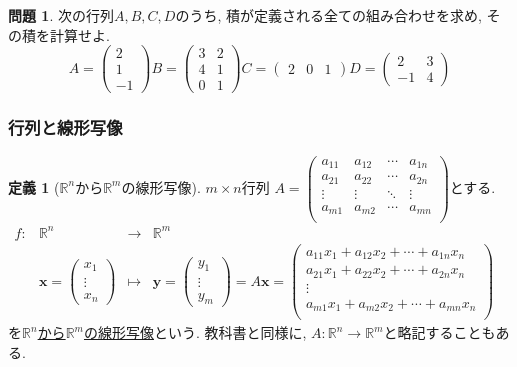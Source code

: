 \documentclass[dvipdfmx,a4paper,11pt]{article}
\newcommand{\R}{\mathbb{R}}
\theoremstyle{definition}
\newtheorem{dfn}[thm]{定義}
\newtheorem{ques}[thm]{問題}
\begin{document}
 \begin{ques}
 次の行列$A,B,C,D$のうち, 積が定義される全ての組み合わせを求め, その積を計算せよ.
 $$
  A=\begin{pmatrix}
 2 \\ 1\\-1
 \end{pmatrix} 
B= \begin{pmatrix}
 3 &2\\
 4&1\\
 0&1
 \end{pmatrix} 
 C=
  \begin{pmatrix}
 2 &0&1 
 \end{pmatrix}
 D= \begin{pmatrix}
 2&3\\
 -1&4
 \end{pmatrix}
 $$
 \end{ques}

  

 \subsubsection{行列と線形写像}
 \begin{tcolorbox}[
    colback = white,
    colframe = green!35!black,
    fonttitle = \bfseries,
    breakable = true]
    \begin{dfn}[$\R^n$から$\R^m$の線形写像]
    \label{dfn-plane-linear}
   $m \times n$行列
$A=
\begin{pmatrix}
a_{11}& a_{12} & \cdots &a_{1n} \\
a_{21}& a_{22} & \cdots &a_{2n} \\
\vdots& \vdots	&	\ddots   &	\vdots \\
a_{m1}& a_{m2} & \cdots &a_{mn} \\
\end{pmatrix}
$とする. 
 $$
\begin{array}{ccccc}
f: &\R^n& \rightarrow & \R^m& \\
&
\bm{x}
=
\begin{pmatrix}
x_1\\\vdots \\ x_n
 \end{pmatrix} & \longmapsto & 
  \bm{y}
  =
  \begin{pmatrix}
y_1\\\vdots \\ y_m
 \end{pmatrix}
  =
  A\bm{x}
  =
 \begin{pmatrix}
a_{11}x_1 + a_{12}x_2 + \cdots +  a_{1n}x_n \\
a_{21}x_1 + a_{22}x_2 + \cdots +  a_{2n}x_n \\
\vdots \\
a_{m1}x_1 + a_{m2}x_2 + \cdots +  a_{mn}x_n \\
 \end{pmatrix}
 &
\end{array}
$$
を\underline{$\R^n$から$\R^m$の線形写像}という.
教科書と同様に, $A: \R^n \to \R^m$と略記することもある.
\end{dfn}
 \end{tcolorbox}
 
\end{document}
